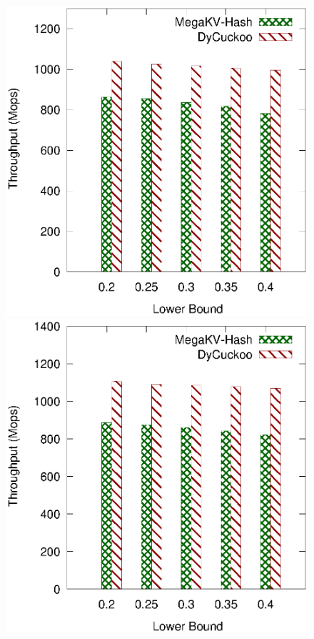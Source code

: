 \begin{figure}[htp]
	\begin{minipage}{0.19\linewidth}\centering
		\includegraphics[width=\linewidth]{pic/dynamic/lower/dynamic_twitter.eps}
		\centerline{\dstwitter}
	\end{minipage}
	\begin{minipage}{0.19\linewidth}\centering
		\includegraphics[width=\linewidth]{pic/dynamic/lower/dynamic_reddit.eps}

\end{minipage}
\end{figure}
